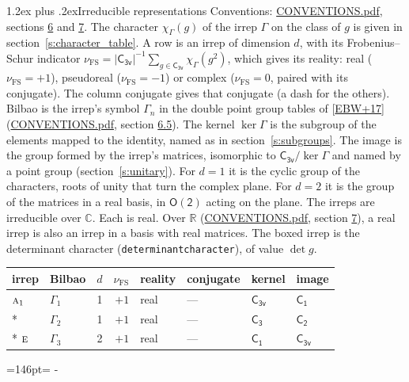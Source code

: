 \documentclass[10pt,a4paper]{article}
\makeatletter
\renewcommand\section{\@startsection{section}{1}{\z@}{-3ex plus -1ex minus -.2ex}%
  {1.2ex plus .2ex}{\normalfont\large\sffamily\bfseries\color{parttitle}}}
\newcommand{\needspace}[1]{\par\penalty-100\begingroup\dimen0=#1\relax\dimen2=\pagegoal
  \advance\dimen2-\pagetotal\ifdim\dimen0>\dimen2\relax\ifdim\dimen2>0pt\vfil\break\fi\fi
  \endgroup}
\numberwithin{equation}{section}
\newcommand{\grp}[1]{\mathsf{#1}}
\newcommand{\irr}[1]{\text{\normalfont\scshape #1}}
\newcommand{\detbox}[1]{{\setlength{\fboxsep}{1pt}\fbox{#1}}}
\newcommand{\irchar}[1]{\chi_{#1}}
\newcommand{\fsind}{\nu_{\mathrm{FS}}}
\makeatother
\begin{document}
\section{Irreducible representations}\label{s:irreps}
Conventions: \href{../../CONVENTIONS.pdf}{CONVENTIONS.pdf}, sections \href{../../CONVENTIONS.pdf\#conv.6}{6} and \href{../../CONVENTIONS.pdf\#conv.7}{7}.
\leavevmode\label{n:function.character}\label{n:irrep.Gamma}The character $\irchar{\Gamma}(g)$ of the irrep $\Gamma$ on the class of $g$ is given in section~\ref{s:character_table}.
\leavevmode\label{n:index.dimension}\label{n:index.frobenius}\label{n:head.irrep}\label{n:head.reality}A row is an irrep of dimension $d$, with its Frobenius--Schur indicator $\fsind = |\grp{C_{3v}}|^{-1}\allowbreak\sum_{g\in\grp{C_{3v}}}\irchar{\Gamma}(g^2)$, which gives its reality: real ($\fsind = +1$), pseudoreal ($\fsind = -1$) or complex ($\fsind = 0$, paired with its conjugate). \label{n:head.conjugate}The column conjugate gives that conjugate (a dash for the others). \label{n:head.bilbao}\label{n:irrep.alias.gamma}Bilbao is the irrep's symbol $\Gamma_n$ in the double point group tables of [\href{../../../REFERENCES.pdf\#ref.EBW+17}{EBW+17}] (\href{../../CONVENTIONS.pdf}{CONVENTIONS.pdf}, section \href{../../CONVENTIONS.pdf\#conv.6.5}{6.5}). \label{n:head.kernel}The kernel $\ker\Gamma$ is the subgroup of the elements mapped to the identity, named as in section~\ref{s:subgroups}. \label{n:head.image}The image is the group formed by the irrep's matrices, isomorphic to $\grp{C_{3v}}/\ker\Gamma$ and named by a point group (section~\ref{s:unitary}). For $d = 1$ it is the cyclic group of the characters, roots of unity that turn the complex plane. For $d = 2$ it is the group of the matrices in a real basis, in $\grp{O(2)}$ acting on the plane. The irreps are irreducible over $\mathbb{C}$. Each is real. Over $\mathbb{R}$ (\href{../../CONVENTIONS.pdf}{CONVENTIONS.pdf}, section \href{../../CONVENTIONS.pdf\#conv.7}{7}), a real irrep is also an irrep in a basis with real matrices. \label{n:mark.determinant}The boxed irrep is the determinant character (\texttt{determinantcharacter}), of value $\det g$.
\setlength{\emergencystretch}{2em}\par\setlength{\emergencystretch}{0pt}
{\small\renewcommand{\arraystretch}{1.25}\begin{longtable}{@{}llrrllll@{}}\toprule
irrep & Bilbao & $d$ & $\fsind$ & reality & conjugate & kernel & image\\\midrule\endhead
\bottomrule\endfoot\endlastfoot
$\irr{a}_{1}$ & $\Gamma_{1}$ & 1 & $+1$ & real & --- & \href{C3v.pdf}{$\grp{C_{3v}}$} & \href{C1.pdf}{$\grp{C_{1}}$}\\*
\detbox{$\irr{a}_{2}$} & $\Gamma_{2}$ & 1 & $+1$ & real & --- & \href{C3.pdf}{$\grp{C_{3}}$} & \href{C2.pdf}{$\grp{C_{2}}$}\\*
$\irr{e}$ & $\Gamma_{3}$ & 2 & $+1$ & real & --- & \href{C1.pdf}{$\grp{C_{1}}$} & \href{C3v.pdf}{$\grp{C_{3v}}$}\\
\bottomrule\end{longtable}}
\needspace{146pt}
\end{document}
